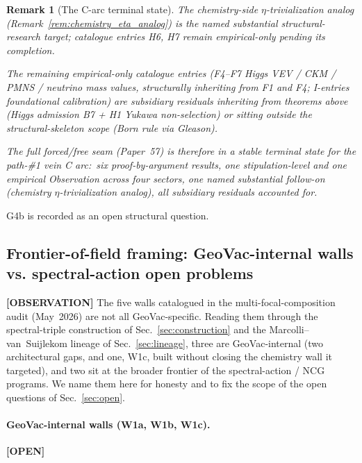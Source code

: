\documentclass[11pt]{article}
\newtheorem{remark}{Remark}
\begin{document}
\begin{remark}[The C-arc terminal state]
The chemistry-side $\eta$-trivialization analog
(Remark~\ref{rem:chemistry_eta_analog}) is the named substantial
structural-research target;  catalogue entries H6, H7 remain
empirical-only pending its completion.

The remaining empirical-only catalogue entries (F4--F7 Higgs VEV /
CKM / PMNS / neutrino mass values, structurally inheriting from F1
and F4;  I-entries foundational calibration) are subsidiary residuals
inheriting from theorems above (Higgs admission B7 + H1 Yukawa
non-selection) or sitting outside the structural-skeleton scope
(Born rule via Gleason).

The full forced/free seam (Paper~57) is therefore in a stable terminal
state for the path-\#1 vein C arc:\ six proof-by-argument
results, one stipulation-level and one empirical Observation across four sectors, one named substantial follow-on (chemistry
$\eta$-trivialization analog), all subsidiary residuals accounted for.
\end{remark}

G4b is recorded as an open structural question.

\subsection{Frontier-of-field framing: GeoVac-internal walls vs.
  spectral-action open problems}
\label{sec:frontier_framing}

\textbf{[OBSERVATION]} The five walls catalogued in the multi-focal-composition audit
(May~2026)
are not all GeoVac-specific.  Reading them through the spectral-triple
construction of Sec.~\ref{sec:construction} and the Marcolli--van~Suijlekom
lineage of Sec.~\ref{sec:lineage}, three are GeoVac-internal (two
architectural gaps, and one, W1c, built without closing the chemistry
wall it targeted), and two sit at the broader frontier
of the spectral-action / NCG programs.  We name them here for honesty
and to fix the scope of the open questions of Sec.~\ref{sec:open}.

\paragraph{GeoVac-internal walls (W1a, W1b, W1c).}
\textbf{[OPEN]}
\end{document}
